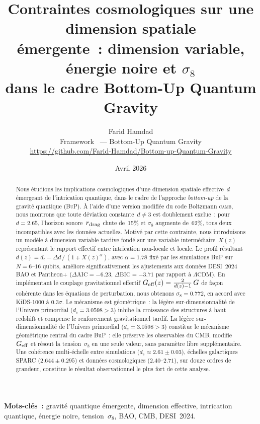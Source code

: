 \documentclass[a4paper,11pt]{article}
\title{\textbf{Contraintes cosmologiques sur une dimension spatiale\\
émergente~: dimension variable, énergie noire et $\sigma_8$\\
dans le cadre Bottom-Up Quantum Gravity}}
\author{Farid Hamdad\\[4pt]
\small Framework \BuP\ --- Bottom-Up Quantum Gravity\\
\small \url{https://github.com/Farid-Hamdad/Bottom-up-Quantum-Gravity}}
\date{Avril 2026}
\newcommand{\DC}{d_c}
\newcommand{\Geff}{G_{\rm eff}}
\newcommand{\rdrag}{r_{\rm drag}}
\newcommand{\sig}{\sigma_8}
\newcommand{\LCDM}{\Lambda\mathrm{CDM}}
\newcommand{\BuP}{\textsc{BuP}}
\newcommand{\camb}{\textsc{camb}}
\begin{document}
\maketitle

\begin{abstract}
Nous étudions les implications cosmologiques d'une dimension spatiale
effective~$d$ émergeant de l'intrication quantique, dans le cadre
de l'approche \textit{bottom-up} de la gravité quantique (\BuP).
À l'aide d'une version modifiée du code Boltzmann \camb, nous montrons
que toute déviation constante~$d\neq 3$ est doublement exclue~:
pour $d=2.65$, l'horizon sonore~$\rdrag$ chute de~15\% et $\sig$
augmente de~62\%, tous deux incompatibles avec les données actuelles.
Motivé par cette contrainte, nous introduisons un modèle à dimension
variable tardive fondé sur une variable intermédiaire~$X(z)$
représentant le rapport effectif entre intrication non-locale et locale.
Le profil résultant $d(z)=\DC - \Delta d\,/\,(1+X(z)^\alpha)$,
avec $\alpha=1.78$ fixé par les simulations BuP sur $N=6$--$16$
qubits, améliore significativement les ajustements aux données
DESI~2024 BAO et Pantheon+ ($\Delta\mathrm{AIC}=-6.23$,
$\Delta\mathrm{BIC}=-3.71$ par rapport à $\LCDM$).
En implémentant le couplage gravitationnel effectif
$\Geff(z)=\frac{2}{d(z)-1}\,G$ de façon cohérente dans les
équations de perturbation, nous obtenons $\sig=0.772$, en accord avec
KiDS-1000 à $0.3\sigma$. Le mécanisme est géométrique~: la légère
sur-dimensionnalité de l'Univers primordial ($\DC=3.0598>3$) inhibe
la croissance des structures à haut redshift et compense le renforcement
gravitationnel tardif. La légère sur-dimensionnalité de l'Univers primordial
($\DC=3.0598>3$) constitue le mécanisme géométrique central du cadre BuP~:
elle préserve les observables du CMB, modifie~$\Geff$ et résout la tension~$\sig$
en une seule valeur, sans paramètre libre supplémentaire.
Une cohérence multi-échelle entre simulations
($d_s\approx 2.61\pm 0.03$), échelles galactiques SPARC ($2.644\pm 0.295$)
et données cosmologiques ($2.40$--$2.71$), sur douze ordres de grandeur,
constitue le résultat observationnel le plus fort de cette analyse.
\end{abstract}

\vspace{0.5cm}
\noindent\textbf{Mots-clés~:} gravité quantique émergente, dimension effective,
intrication quantique, énergie noire, tension~$\sigma_8$, BAO, CMB, DESI~2024.
\end{document}

